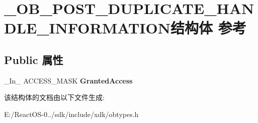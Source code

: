 \hypertarget{struct___o_b___p_o_s_t___d_u_p_l_i_c_a_t_e___h_a_n_d_l_e___i_n_f_o_r_m_a_t_i_o_n}{}\section{\+\_\+\+O\+B\+\_\+\+P\+O\+S\+T\+\_\+\+D\+U\+P\+L\+I\+C\+A\+T\+E\+\_\+\+H\+A\+N\+D\+L\+E\+\_\+\+I\+N\+F\+O\+R\+M\+A\+T\+I\+O\+N结构体 参考}
\label{struct___o_b___p_o_s_t___d_u_p_l_i_c_a_t_e___h_a_n_d_l_e___i_n_f_o_r_m_a_t_i_o_n}
\subsection*{Public 属性}
\begin{DoxyCompactItemize}
\item 
\mbox{\label{struct___o_b___p_o_s_t___d_u_p_l_i_c_a_t_e___h_a_n_d_l_e___i_n_f_o_r_m_a_t_i_o_n_aa3ca01838a5d6f4aa8fab7e592e81808}} 
\+\_\+\+In\+\_\+ A\+C\+C\+E\+S\+S\+\_\+\+M\+A\+SK {\bfseries Granted\+Access}
\end{DoxyCompactItemize}


该结构体的文档由以下文件生成\+:\begin{DoxyCompactItemize}
\item 
E\+:/\+React\+O\+S-\/0../sdk/include/xdk/obtypes.\+h\end{DoxyCompactItemize}
